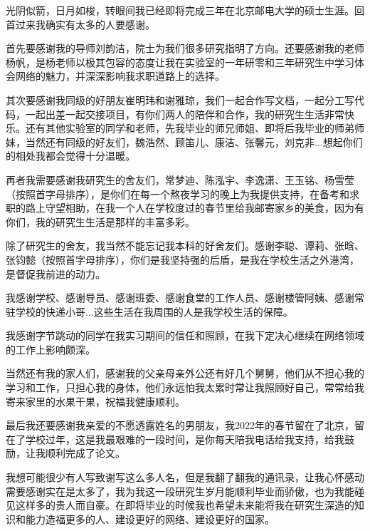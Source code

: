 
\begin{acknowledgement}
  光阴似箭，日月如梭，转眼间我已经即将完成三年在北京邮电大学的硕士生涯。回首过来我确实有太多的人要感谢。

  首先要感谢我的导师刘韵洁，院士为我们很多研究指明了方向。还要感谢我的老师杨帆，是杨老师以极其包容的态度让我在实验室的一年研零和三年研究生中学习体会网络的魅力，并深深影响我求职道路上的选择。

  其次要感谢我同级的好朋友崔明玮和谢雅琼，我们一起合作写文档，一起分工写代码，一起出差一起交接项目，有你们两人的陪伴和合作，我的研究生生活非常快乐。还有其他实验室的同学和老师，先我毕业的师兄师姐、即将后我毕业的师弟师妹，当然还有同级的好友们，魏浩然、顾笛儿、康洁、张馨元，刘克非...想起你们的相处我都会觉得十分温暖。

  再者我需要感谢我研究生的舍友们，常梦迪、陈泓宇、李逸潇、王玉铭、杨雪莹（按照首字母排序），是你们在每一个熬夜学习的晚上为我提供支持，在备考和求职的路上守望相助，在我一个人在学校度过的春节里给我邮寄家乡的美食，因为有你们，我的研究生生活是那样的丰富多彩。

  除了研究生的舍友，我当然不能忘记我本科的好舍友们。感谢李聪、谭莉、张晗、张钧懿（按照首字母排序），你们是我坚持强的后盾，是我在学校生活之外港湾，是督促我前进的动力。

  我感谢学校、感谢导员、感谢班委、感谢食堂的工作人员、感谢楼管阿姨、感谢常驻学校的快递小哥...这些生活在我周围的人是我学校生活的保障。
  
  我感谢字节跳动的同学在我实习期间的信任和照顾，在我下定决心继续在网络领域的工作上影响颇深。

  当然还有我的家人们，感谢我的父亲母亲外公还有好几个舅舅，他们从不担心我的学习和工作，只担心我的身体，他们永远怕我太累时常让我照顾好自己，常常给我寄来家里的水果干果，祝福我健康顺利。

  最后我还要感谢我亲爱的不愿透露姓名的男朋友，我2022年的春节留在了北京，留在了学校过年，这是我最艰难的一段时间，是你每天陪我电话给我支持，给我鼓励，让我顺利完成了论文。

  我想可能很少有人写致谢写这么多人名，但是我翻了翻我的通讯录，让我心怀感动需要感谢实在是太多了，我为我这一段研究生岁月能顺利毕业而骄傲，也为我能碰见这样多的贵人而自豪。在即将毕业的时候我也希望未来能将我在研究生深造的知识和能力造福更多的人、建设更好的网络、建设更好的国家。

\end{acknowledgement}
